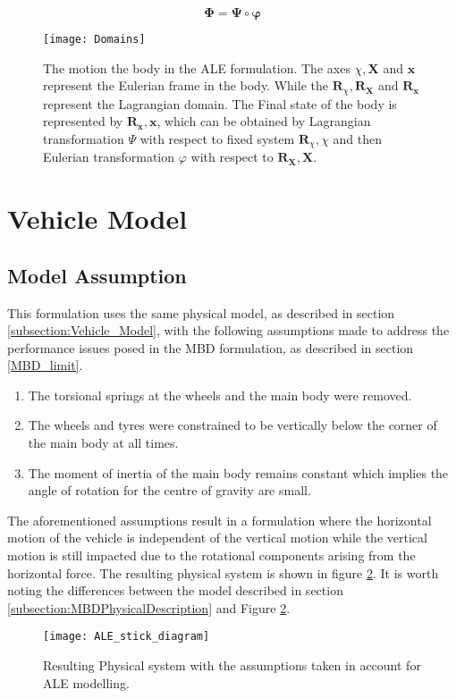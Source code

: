 \begin{equation}\label{eq:ALE_Transformation}
     \boldsymbol{\Phi} = \boldsymbol{\Psi} \circ \boldsymbol{\varphi}
\end{equation}

\begin{figure}[!ht]
    \centering
    \texttt{[image: Domains]}
    \caption{The motion the body in the ALE formulation. The axes $\chi, \mathbf{X}$ and $\mathbf{x}$ represent the Eulerian frame in the body. While the $\mathbf{R}_{\chi}, \mathbf{R}_{\mathbf{X}}$ and $\mathbf{R}_{\mathbf{x}}$ represent the Lagrangian domain. The Final state of the body is represented by $\mathbf{R}_{\mathbf{x}}, \mathbf{x}$, which can be obtained by Lagrangian transformation $\Psi$ with respect to fixed system $\mathbf{R}_{\chi}, \chi$ and then Eulerian transformation $\varphi$ with respect to $\mathbf{R}_{\mathbf{X}}, \mathbf{X}$.}
    \label{fig:ALEdomain}
\end{figure}

\section{Vehicle Model}
\subsection{Model Assumption}
\label{subsection:ALEModelAssumption}
This formulation uses the same physical model, as described in section \ref{subsection:Vehicle_Model}, with the following assumptions made to address the performance issues posed in the MBD formulation, as described in section \ref{MBD_limit}. \par
\begin{enumerate}
    \item The torsional springs at the wheels and the main body were removed.
    \item The wheels and tyres were constrained to be vertically below the corner of the main body at all times.
    \item The moment of inertia of the main body remains constant which implies the angle of rotation for the centre of gravity are small.
\end{enumerate}
The aforementioned assumptions result in a formulation where the horizontal motion of the vehicle is independent of the vertical motion while the vertical motion is still impacted due to the rotational components arising from the horizontal force. The resulting physical system is shown in figure \ref{fig:ALEstick}. It is worth noting the differences between the model described in section \ref{subsection:MBDPhysicalDescription} and Figure \ref{fig:ALEstick}. \par
\begin{figure}[!ht]
    \centering
    \texttt{[image: ALE\_stick\_diagram]}
    \caption{Resulting Physical system with the assumptions taken in account for ALE modelling.}
    \label{fig:ALEstick}
\end{figure}

